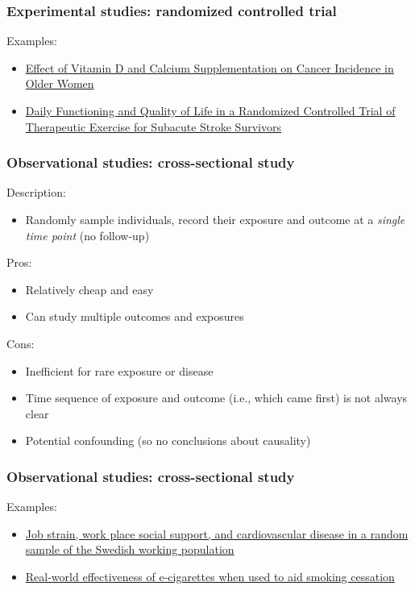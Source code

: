 \documentclass[12pt, 
hyperref={colorlinks=true, linkcolor=blue, urlcolor=cyan}]{beamer}
\begin{document}
\begin{frame}
\frametitle{Experimental studies: randomized controlled trial}
Examples:
\begin{itemize}
\item \href{https://jamanetwork.com/journals/jama/article-abstract/2613159}{Effect of Vitamin D and Calcium Supplementation on Cancer Incidence in Older Women}
\item \href{http://stroke.ahajournals.org/content/36/8/1764.short}{Daily Functioning and Quality of Life in a Randomized Controlled Trial of Therapeutic Exercise for Subacute Stroke Survivors}
\end{itemize}
\end{frame}

\begin{frame}
\frametitle{Observational studies: cross-sectional study}
Description: \vspace{-0.3cm}
\begin{itemize}
\item Randomly sample individuals, record their exposure and outcome at a \textit{single time point} (no follow-up) %
\end{itemize}

\pause
Pros:\vspace{-0.3cm}
\begin{itemize}
\item Relatively cheap and easy
\item Can study multiple outcomes and exposures %
\end{itemize}

\pause
Cons:\vspace{-0.3cm}
\begin{itemize}
\item Inefficient for rare exposure or disease %
\item Time sequence of exposure and outcome (i.e., which came first) is not always clear %
\item Potential confounding (so no conclusions about causality)
\end{itemize}
\end{frame}

\begin{frame}
\frametitle{Observational studies: cross-sectional study}
Examples:
\begin{itemize}
\item \href{http://ajph.aphapublications.org/doi/abs/10.2105/AJPH.78.10.1336}{Job strain, work place social support, and cardiovascular disease in a random sample of the Swedish working population}
\item \href{onlinelibrary.wiley.com/doi/10.1111/add.12623/full}{Real-world effectiveness of e-cigarettes when used to aid smoking cessation}
\end{itemize}
\end{frame}
\end{document}
